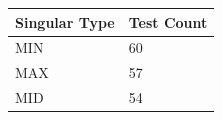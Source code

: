 \begin{table}[h!]
\centering
\begin{tabular}{ll}
\hline
\textbf{Singular Type} & \textbf{Test Count} \\ 
\hline
MIN & 60 \\ 
MAX & 57 \\ 
MID & 54 \\ 
\hline
\end{tabular}
\end{table}